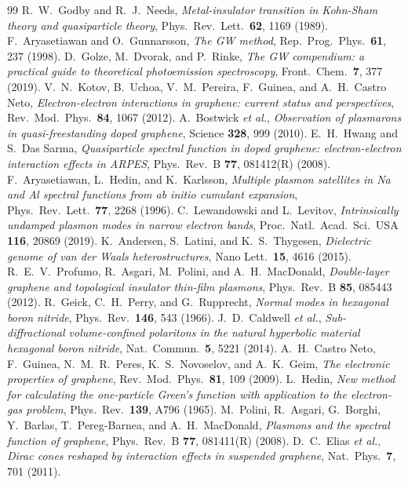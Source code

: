 \documentclass[11pt,a4paper]{article}
\theoremstyle{remark}
\begin{document}
\begin{thebibliography}{99}
 R.~W.~Godby and R.~J.~Needs, \emph{Metal-insulator transition in Kohn-Sham theory and quasiparticle theory}, Phys.~Rev.~Lett.~\textbf{62}, 1169 (1989).
 F.~Aryasetiawan and O.~Gunnarsson, \emph{The GW method}, Rep.~Prog.~Phys.~\textbf{61}, 237 (1998).
 D.~Golze, M.~Dvorak, and P.~Rinke, \emph{The GW compendium: a practical guide to theoretical photoemission spectroscopy}, Front.~Chem.~\textbf{7}, 377 (2019).
 V.~N.~Kotov, B.~Uchoa, V.~M.~Pereira, F.~Guinea, and A.~H.~Castro Neto, \emph{Electron-electron interactions in graphene: current status and perspectives}, Rev.~Mod.~Phys.~\textbf{84}, 1067 (2012).
 A.~Bostwick \emph{et al.}, \emph{Observation of plasmarons in quasi-freestanding doped graphene}, Science \textbf{328}, 999 (2010).
 E.~H.~Hwang and S.~Das Sarma, \emph{Quasiparticle spectral function in doped graphene: electron-electron interaction effects in ARPES}, Phys.~Rev.~B \textbf{77}, 081412(R) (2008).
 F.~Aryasetiawan, L.~Hedin, and K.~Karlsson, \emph{Multiple plasmon satellites in Na and Al spectral functions from ab initio cumulant expansion}, Phys.~Rev.~Lett.~\textbf{77}, 2268 (1996).
 C.~Lewandowski and L.~Levitov, \emph{Intrinsically undamped plasmon modes in narrow electron bands}, Proc.~Natl.~Acad.~Sci.~USA \textbf{116}, 20869 (2019).
 K.~Andersen, S.~Latini, and K.~S.~Thygesen, \emph{Dielectric genome of van der Waals heterostructures}, Nano Lett.~\textbf{15}, 4616 (2015).
 R.~E.~V.~Profumo, R.~Asgari, M.~Polini, and A.~H.~MacDonald, \emph{Double-layer graphene and topological insulator thin-film plasmons}, Phys.~Rev.~B \textbf{85}, 085443 (2012).
 R.~Geick, C.~H.~Perry, and G.~Rupprecht, \emph{Normal modes in hexagonal boron nitride}, Phys.~Rev.~\textbf{146}, 543 (1966).
 J.~D.~Caldwell \emph{et al.}, \emph{Sub-diffractional volume-confined polaritons in the natural hyperbolic material hexagonal boron nitride}, Nat.~Commun.~\textbf{5}, 5221 (2014).
 A.~H.~Castro Neto, F.~Guinea, N.~M.~R.~Peres, K.~S.~Novoselov, and A.~K.~Geim, \emph{The electronic properties of graphene}, Rev.~Mod.~Phys.~\textbf{81}, 109 (2009).
 L.~Hedin, \emph{New method for calculating the one-particle Green's function with application to the electron-gas problem}, Phys.~Rev.~\textbf{139}, A796 (1965).
 M.~Polini, R.~Asgari, G.~Borghi, Y.~Barlas, T.~Pereg-Barnea, and A.~H.~MacDonald, \emph{Plasmons and the spectral function of graphene}, Phys.~Rev.~B \textbf{77}, 081411(R) (2008).
 D.~C.~Elias \emph{et al.}, \emph{Dirac cones reshaped by interaction effects in suspended graphene}, Nat.~Phys.~\textbf{7}, 701 (2011).
\end{thebibliography}
\end{document}
